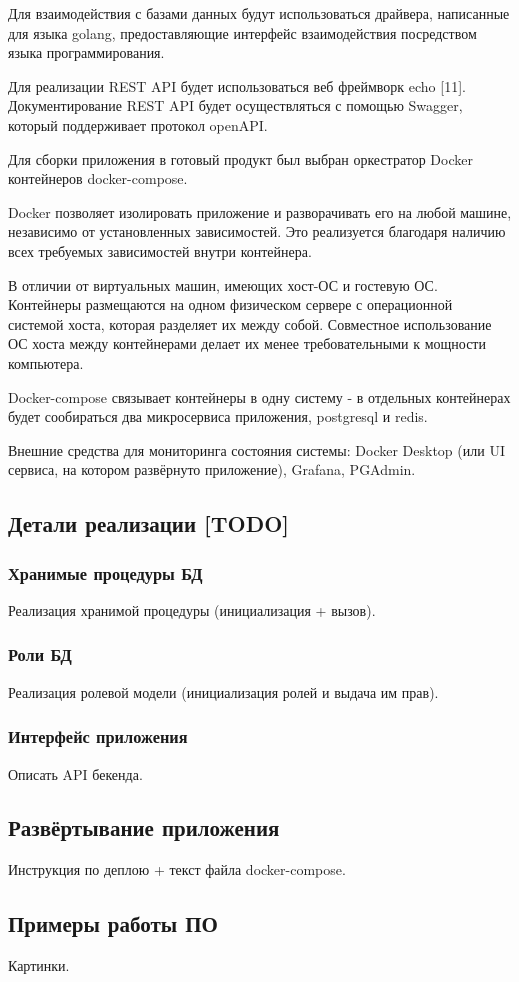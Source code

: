 Для взаимодействия с базами данных будут использоваться драйвера, написанные для языка golang, предоставляющие интерфейс взаимодействия посредством языка программирования.

Для реализации REST API будет использоваться веб фреймворк echo [11]. Документирование REST API будет осуществляться с помощью Swagger, который поддерживает протокол openAPI.

Для сборки приложения в готовый продукт был выбран оркестратор Docker контейнеров docker-compose.

Docker позволяет изолировать приложение и разворачивать его на любой машине, независимо от установленных зависимостей. Это реализуется благодаря наличию всех требуемых зависимостей внутри контейнера.

В отличии от виртуальных машин, имеющих хост-ОС и гостевую ОС. Контейнеры размещаются на одном физическом сервере с операционной системой хоста, которая разделяет их между собой. Совместное использование ОС хоста между контейнерами делает их менее требовательными к мощности компьютера.

Docker-compose связывает контейнеры в одну систему - в отдельных контейнерах будет сообираться два микросервиса приложения, postgresql и redis.

Внешние средства для мониторинга состояния системы: Docker Desktop (или UI сервиса, на котором развёрнуто приложение), Grafana, PGAdmin.



\subsection{Детали реализации [TODO]}

\subsubsection{Хранимые процедуры БД}

Реализация хранимой процедуры (инициализация + вызов).

\subsubsection{Роли БД}

Реализация ролевой модели (инициализация ролей и выдача им прав).

\subsubsection{Интерфейс приложения}

Описать API бекенда.

\subsection{Развёртывание приложения}

Инструкция по деплою + текст файла docker-compose.

\subsection{Примеры работы ПО}

Картинки.

\pagebreak